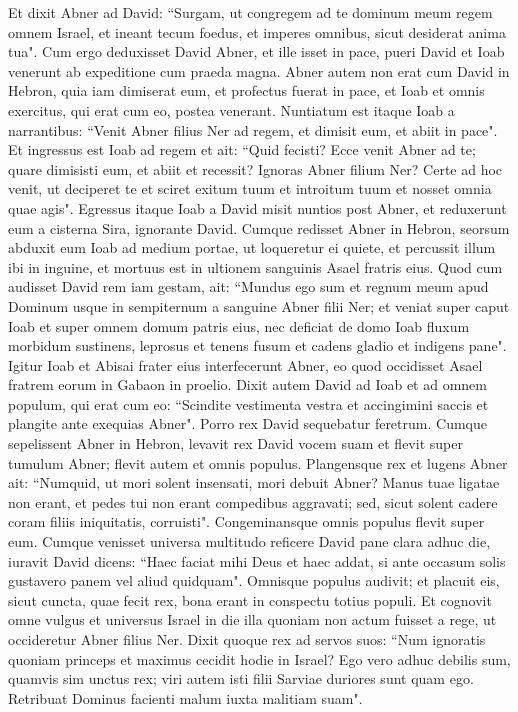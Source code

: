 \begin{biblechapter}
\verse Et dixit Abner ad David: “Surgam, ut congregem ad te dominum meum regem omnem Israel, et ineant tecum foedus, et imperes omnibus, sicut desiderat anima tua". Cum ergo deduxisset David Abner, et ille isset in pace, 
\verse pueri David et Ioab venerunt ab expeditione cum praeda magna. Abner autem non erat cum David in Hebron, quia iam dimiserat eum, et profectus fuerat in pace, 
\verse et Ioab et omnis exercitus, qui erat cum eo, postea venerant. Nuntiatum est itaque Ioab a narrantibus: “Venit Abner filius Ner ad regem, et dimisit eum, et abiit in pace". 
\verse Et ingressus est Ioab ad regem et ait: “Quid fecisti? Ecce venit Abner ad te; quare dimisisti eum, et abiit et recessit? 
\verse Ignoras Abner filium Ner? Certe ad hoc venit, ut deciperet te et sciret exitum tuum et introitum tuum et nosset omnia quae agis". 
\verse Egressus itaque Ioab a David misit nuntios post Abner, et reduxerunt eum a cisterna Sira, ignorante David. 
\verse Cumque redisset Abner in Hebron, seorsum abduxit eum Ioab ad medium portae, ut loqueretur ei quiete, et percussit illum ibi in inguine, et mortuus est in ultionem sanguinis Asael fratris eius. 
\verse Quod cum audisset David rem iam gestam, ait: “Mundus ego sum et regnum meum apud Dominum usque in sempiternum a sanguine Abner filii Ner; 
\verse et veniat super caput Ioab et super omnem domum patris eius, nec deficiat de domo Ioab fluxum morbidum sustinens, leprosus et tenens fusum et cadens gladio et indigens pane". 
\verse Igitur Ioab et Abisai frater eius interfecerunt Abner, eo quod occidisset Asael fratrem eorum in Gabaon in proelio. 
\verse Dixit autem David ad Ioab et ad omnem populum, qui erat cum eo: “Scindite vestimenta vestra et accingimini saccis et plangite ante exequias Abner". Porro rex David sequebatur feretrum. 
\verse Cumque sepelissent Abner in Hebron, levavit rex David vocem suam et flevit super tumulum Abner; flevit autem et omnis populus. 
\verse Plangensque rex et lugens Abner ait: “Numquid, ut mori solent insensati, mori debuit Abner? 
\verse Manus tuae ligatae non erant, et pedes tui non erant compedibus aggravati; sed, sicut solent cadere coram filiis iniquitatis, corruisti". Congeminansque omnis populus flevit super eum. 
\verse Cumque venisset universa multitudo reficere David pane clara adhuc die, iuravit David dicens: “Haec faciat mihi Deus et haec addat, si ante occasum solis gustavero panem vel aliud quidquam". 
\verse Omnisque populus audivit; et placuit eis, sicut cuncta, quae fecit rex, bona erant in conspectu totius populi. 
\verse Et cognovit omne vulgus et universus Israel in die illa quoniam non actum fuisset a rege, ut occideretur Abner filius Ner. 
\verse Dixit quoque rex ad servos suos: “Num ignoratis quoniam princeps et maximus cecidit hodie in Israel? 
\verse Ego vero adhuc debilis sum, quamvis sim unctus rex; viri autem isti filii Sarviae duriores sunt quam ego. Retribuat Dominus facienti malum iuxta malitiam suam". 
\end{biblechapter}

